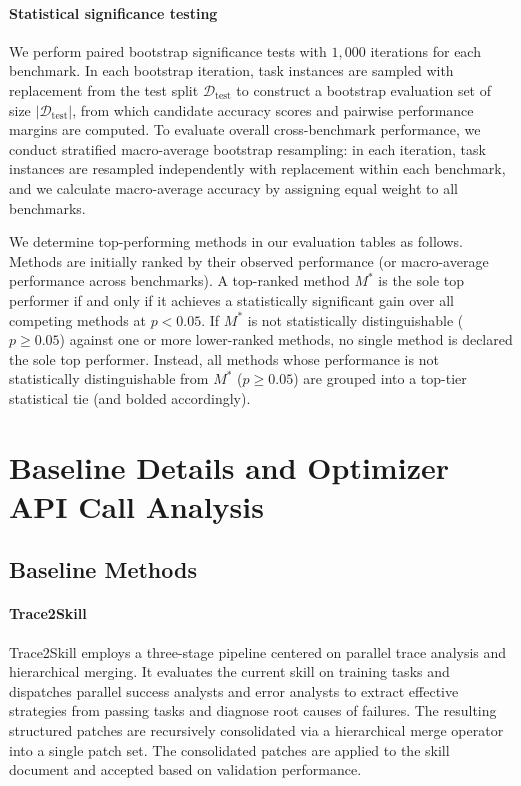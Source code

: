 \documentclass[11pt, a4paper, copyright, gr]{google}
\begin{document}
\paragraph{Statistical significance testing} We perform paired bootstrap significance tests with $1,000$ iterations for each benchmark. In each bootstrap iteration, task instances are sampled with replacement from the test split $\mathcal{D}_{\text{test}}$ to construct a bootstrap evaluation set of size $|\mathcal{D}_{\text{test}}|$, from which candidate accuracy scores and pairwise performance margins are computed. To evaluate overall cross-benchmark performance, we conduct stratified macro-average bootstrap resampling: in each iteration, task instances are resampled independently with replacement within each benchmark, and we calculate macro-average accuracy by assigning equal weight to all benchmarks.

We determine top-performing methods in our evaluation tables as follows. Methods are initially ranked by their observed performance (or macro-average performance across benchmarks). A top-ranked method $M^*$ is the sole top performer if and only if it achieves a statistically significant gain over all competing methods at $p < 0.05$. If $M^*$ is not statistically distinguishable ($p \ge 0.05$) against one or more lower-ranked methods, no single method is declared the sole top performer. Instead, all methods whose performance is not statistically distinguishable from $M^*$ ($p \ge 0.05$) are grouped into a top-tier statistical tie (and bolded accordingly).


\section{Baseline Details and Optimizer API Call Analysis}
\label{appendix:api_complexity}

\subsection{Baseline Methods}

\paragraph{Trace2Skill~\citep{ni2026trace2skill}}
Trace2Skill employs a three-stage pipeline centered on parallel trace analysis and hierarchical merging. It evaluates the current skill on training tasks and dispatches parallel success analysts and error analysts to extract effective strategies from passing tasks and diagnose root causes of failures. The resulting structured patches are recursively consolidated via a hierarchical merge operator into a single patch set. The consolidated patches are applied to the skill document and accepted based on validation performance.
\end{document}
